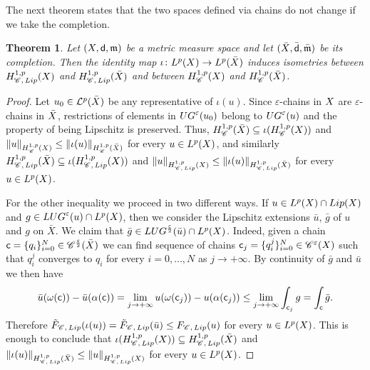 \documentclass[12pt]{amsart}
\newcommand{\sfd}{{\sf d}}
\newcommand{\X}{{\rm X}}
\newcommand{\Lip}{{\rm Lip}}
\newcommand{\mm}{\mathfrak m}
\newcommand{\F}{{\rm F}}
\newtheorem{theorem}{Theorem}[section]
\theoremstyle{definition}
\newcommand{\sfc}{{\sf c}}
\newcommand{\Chain}[1]{\mathscr{C}^{#1}}
\newcommand{\UG}[1]{{\rm UG}^{#1}}
\newcommand{\LUG}[1]{{\rm LUG}^{#1}}
\newcommand{\HH}[2]{H^{1,#1}_{{\rm #2}}}
\renewcommand{\F}[1]{{\rm F}_{{\rm #1}}}
\newcommand{\relF}[1]{\tilde{\rm F}_{{\rm #1}}}
\begin{document}
%
The next theorem states that the two spaces defined via chains do not change if we take the completion.
%
\begin{theorem}
\label{theo:natural_isometries_chains}
    Let $(\X,\sfd,\mm)$ be a metric measure space and let $(\bar{\X}, \bar{\sfd}, \bar{\mm})$ be its completion. Then the identity map $\iota\colon L^p(\X) \to L^p(\bar{\X})$ induces isometries between $\HH{p}{\Chain{}, \, \Lip}(\X)$ and $\HH{p}{\Chain{}, \, \Lip}(\bar{\X})$ and between $\HH{p}{\Chain{}}(\X)$ and $\HH{p}{\Chain{}}(\bar{\X})$.
\end{theorem}
%
\begin{proof}
    Let $u_0\in \mathcal{L}^p(\bar{\X})$ be any representative of $\iota(u)$.
    Since $\varepsilon$-chains in $\X$ are $\varepsilon$-chains in $\bar{\X}$, restrictions of elements in $\UG{\varepsilon}(u_0)$ belong to $\UG{\varepsilon}(u)$ and the property of being Lipschitz is preserved. Thus, $\HH{p}{\Chain{}}(\bar{\X})\subseteq \iota(\HH{p}{\Chain{}}(\X))$ and $\|u\|_{\HH{p}{\Chain{}}(\X)} \le \| \iota(u) \|_{\HH{p}{\Chain{}}(\bar{\X})}$ for every $u \in L^p(\X)$, and similarly $\HH{p}{\Chain{},\,\Lip}(\bar{\X})\subseteq \iota(\HH{p}{\Chain{},\,\Lip}(\X))$ and $\|u\|_{\HH{p}{\Chain{},\,\Lip}(\X)} \le \| \iota(u) \|_{\HH{p}{\Chain{},\,\Lip}(\bar{\X})}$ for every $u \in L^p(\X)$. 
    
    For the other inequality we proceed in two different ways. If $u \in L^p(\X) \cap \Lip(\X)$ and $g\in \LUG{\varepsilon}(u) \cap L^p(\X)$, then we consider the Lipschitz extensions $\bar{u}$, $\bar{g}$ of $u$ and $g$ on $\bar{X}$. We claim that $\bar{g}\in \LUG{\frac{\varepsilon}{2}}(\bar{u}) \cap L^p(\X)$. Indeed, given a chain $\sfc = \{q_i\}_{i=0}^N \in \Chain{\frac{\varepsilon}{2}}(\bar{\X})$ we can find sequence of chains $\sfc_j = \{q_i^j\}_{i=0}^N \in \Chain{\varepsilon}(\X)$ such that $q_i^j$ converges to $q_i$ for every $i=0,\ldots,N$ as $j\to +\infty$. By continuity of $\bar{g}$ and $\bar{u}$ we then have
    $$\bar{u}(\omega(\sfc)) - \bar{u}(\alpha(\sfc)) = \lim_{j\to +\infty} u(\omega(\sfc_j)) - u(\alpha(\sfc_j)) \le \lim_{j\to +\infty}\int_{\sfc_j} g = \int_{\sfc}\bar{g}.$$
    Therefore $\relF{\Chain{},\,\Lip}(\iota(u)) = \relF{\Chain{},\,\Lip}(\bar{u}) \le \F{\Chain{},\,\Lip}(u)$ for every $u\in L^p(\X)$. This is enough to conclude that $\iota(\HH{p}{\Chain{},\,\Lip}(\X)) \subseteq \HH{p}{\Chain{},\,\Lip}(\bar{\X})$ and $\|\iota(u) \|_{\HH{p}{\Chain{},\,\Lip}(\bar{\X})} \le \|u\|_{\HH{p}{\Chain{},\,\Lip}(\X)}$ for every $u \in L^p(\X)$.
    

\end{proof}
\end{document}
